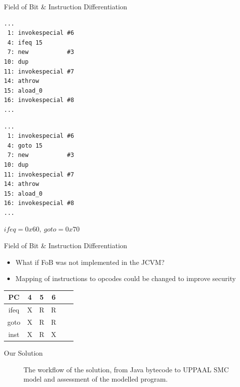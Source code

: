 \begin{frame}[fragile]{Field of Bit \& Instruction Differentiation}
\begin{minipage}{.45\textwidth}
\begin{lstlisting}[frame=single]
...
 1: invokespecial #6
 4: ifeq 15
 7: new           #3
10: dup
11: invokespecial #7
14: athrow
15: aload_0
16: invokespecial #8
...
\end{lstlisting}
\end{minipage}%
\hspace{20px}
\begin{minipage}{0.45\textwidth}
\begin{lstlisting}[frame=single]
...
 1: invokespecial #6
 4: goto 15
 7: new           #3
10: dup
11: invokespecial #7
14: athrow
15: aload_0
16: invokespecial #8
...
\end{lstlisting}
\end{minipage}
\begin{center}
$ifeq = 0x60,\:goto = 0x70$
\end{center}
\end{frame}

\begin{frame}[fragile]{Field of Bit \& Instruction Differentiation}
\begin{itemize}
\item What if FoB was not implemented in the JCVM?
\item Mapping of instructions to opcodes could be changed to improve security
\end{itemize}
\begin{table}
\centering
\begin{tabular}{|c|c|c|c|c|c|}
\hline PC & 4 & 5 & 6   \\ 
\hline ifeq & X & R & R \\ 
\hline goto & X & R & R \\ 
\hline inst & X & R & X \\ 
\hline 
\end{tabular} 
\end{table}
\end{frame}

\begin{frame}[fragile]{Our Solution}
\begin{center}
\begin{figure}
\def\svgwidth{\columnwidth}

\caption{The workflow of the solution, from Java bytecode to UPPAAL SMC model and assessment of the modelled program.}
\label{fig:workflow_new}
\end{figure}
\end{center}
\end{frame}

